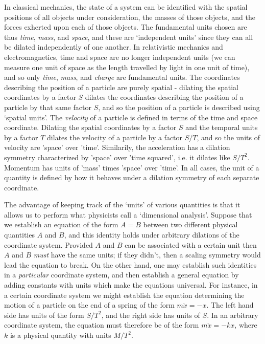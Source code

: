 In classical mechanics, the state of a system can be identified with the spatial positions of all objects under consideration, the masses of those objects, and the forces exherted upon each of those objects. The fundamental units chosen are thus \emph{time}, \emph{mass}, and \emph{space}, and these are `independent units' since they can all be dilated independently of one another. In relativistic mechanics and electromagnetics, time and space are no longer independent units (we can measure one unit of space as the length travelled by light in one unit of time), and so only \emph{time}, \emph{mass}, and \emph{charge} are fundamental units. The coordinates describing the position of a particle are purely spatial - dilating the spatial coordinates by a factor $S$ dilates the coordinates describing the position of a particle by that same factor $S$, and so the position of a particle is described using `spatial units'. The \emph{velocity} of a particle is defined in terms of the time and space coordinate. Dilating the spatial coordinates by a factor $S$ and the temporal units by a factor $T$ dilates the velocity of a particle by a factor $S/T$, and so the units of velocity are 'space' over 'time'. Similarily, the acceleration has a dilation symmetry characterized by 'space' over 'time squared', i.e. it dilates like $S/T^2$. Momentum has units of 'mass' times 'space' over 'time'. In all cases, the unit of a quantity is defined by how it behaves under a dilation symmetry of each separate coordinate.

The advantage of keeping track of the `units' of various quantities is that it allows us to perform what physicists call a `dimensional analysis'. Suppose that we establish an equation of the form $A = B$ between two different physical quantities $A$ and $B$, and this identity holds under arbitrary dilations of the coordinate system. Provided $A$ and $B$ can be associated with a certain unit then $A$ and $B$ \emph{must} have the same units; if they didn't, then a scaling symmetry would lead the equation to break. On the other hand, one may establish such identities in a \emph{particular} coordinate system, and then establish a general equation by adding constants with units which make the equations universal. For instance, in a certain coordinate system we might establish the equation determining the motion of a particle on the end of a spring of the form $m \ddot{x} = -x$. The left hand side has units of the form $S/T^2$, and the right side has units of $S$. In an arbitrary coordinate system, the equation must therefore be of the form $m\ddot{x} = - kx$, where $k$ is a physical quantity with units $M/T^2$.

